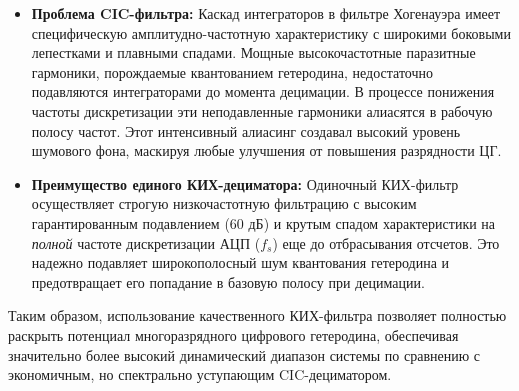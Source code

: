 \begin{itemize}
    \item \textbf{Проблема CIC-фильтра:} Каскад интеграторов в фильтре Хогенауэра имеет специфическую амплитудно-частотную характеристику с широкими боковыми лепестками и плавными спадами. Мощные высокочастотные паразитные гармоники, порождаемые квантованием гетеродина, недостаточно подавляются интеграторами до момента децимации. В процессе понижения частоты дискретизации эти неподавленные гармоники алиасятся в рабочую полосу частот. Этот интенсивный алиасинг создавал высокий уровень шумового фона, маскируя любые улучшения от повышения разрядности ЦГ.
    \item \textbf{Преимущество единого КИХ-дециматора:} Одиночный КИХ-фильтр осуществляет строгую низкочастотную фильтрацию с высоким гарантированным подавлением (60 дБ) и крутым спадом характеристики на \textit{полной} частоте дискретизации АЦП ($f_s$) еще до отбрасывания отсчетов. Это надежно подавляет широкополосный шум квантования гетеродина и предотвращает его попадание в базовую полосу при децимации. 
\end{itemize}

Таким образом, использование качественного КИХ-фильтра позволяет полностью раскрыть потенциал многоразрядного цифрового гетеродина, обеспечивая значительно более высокий динамический диапазон системы по сравнению с экономичным, но спектрально уступающим CIC-дециматором.